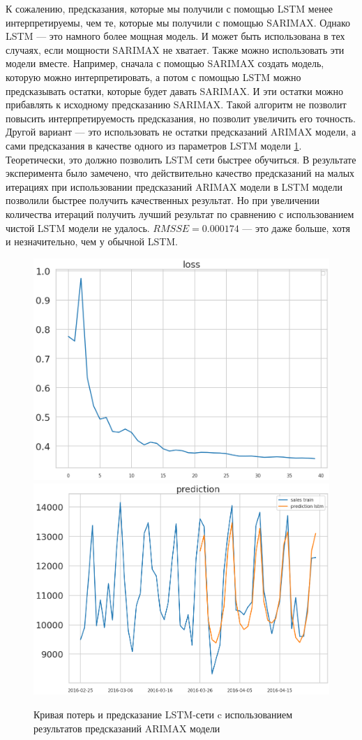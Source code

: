 К сожалению, предсказания, которые мы получили с помощью  LSTM менее интерпретируемы,
чем те, которые мы получили с помощью SARIMAX. Однако LSTM --- это намного более
мощная модель. И может быть использована в тех случаях, если мощности SARIMAX не хватает.
Также можно использовать эти модели вместе. Например, сначала с помощью SARIMAX создать
модель, которую можно интерпретировать, а потом с помощью LSTM можно предсказывать остатки, которые будет
давать SARIMAX. И эти остатки можно прибавлять к исходному предсказанию SARIMAX. Такой алгоритм
не позволит повысить интерпретируемость предсказания, но позволит увеличить его точность.
Другой вариант --- это использовать не остатки предсказаний ARIMAX модели, а
сами предсказания в качестве одного из параметров LSTM модели \ref{img:lstm_with_arima_forecast}.
Теоретически, это должно позволить LSTM сети быстрее обучиться.
В результате эксперимента было замечено, что действительно качество предсказаний
на малых итерациях при использовании предсказаний ARIMAX модели в LSTM модели
позволили быстрее получить качественных результат. Но при увеличении количества итераций
получить лучший результат по сравнению с использованием чистой LSTM модели не удалось.
$ RMSSE = 0.000174 $ --- это даже больше, хотя и незначительно, чем у обычной LSTM.

\def\figurename{Рис}
\begin{figure}[t]
	\centering
	\includegraphics[width=0.4\columnwidth]{./img/lstm_with_arima_loss.png}
	\includegraphics[width=0.4\columnwidth]{./img/lstm_with_arima_prediction.png}
	\caption{Кривая потерь и предсказание LSTM-сети c использованием результатов предсказаний ARIMAX модели}
	\label{img:lstm_with_arima_forecast}
\end{figure}

